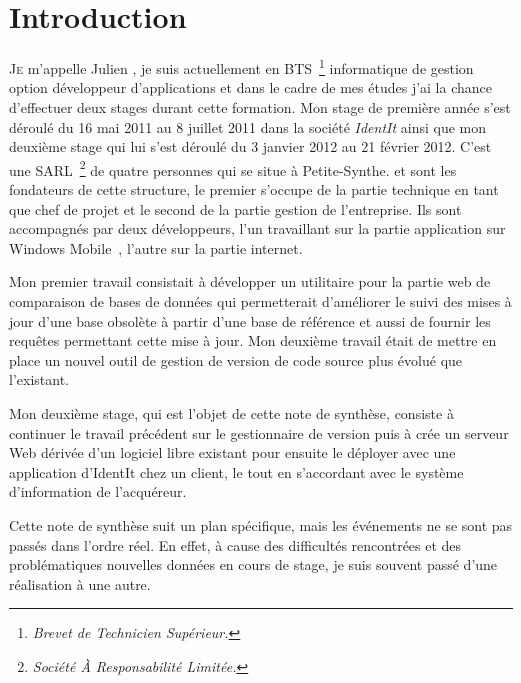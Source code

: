 \chapter{Introduction} %
\label{cha:Introduction}

\lettrine{J}{e} m'appelle Julien , je suis actuellement en
BTS\, \footnote{\emph{Brevet de Technicien Supérieur.}} informatique de
gestion option développeur d'applications et dans le cadre de mes études
j'ai la chance d'effectuer deux stages durant cette formation. Mon stage
de première année s'est déroulé du 16 mai 2011 au 8 juillet 2011 dans la
société \emph{IdentIt} ainsi que mon deuxième stage qui lui s'est
déroulé du 3 janvier 2012 au 21 février 2012. C'est une SARL\,
\footnote{\emph{Société À Responsabilité Limitée.}} de quatre personnes
qui se situe à Petite-Synthe.  et  sont
les fondateurs de cette structure, le premier s'occupe de la partie
technique en tant que chef de projet et le second de la partie gestion
de l'entreprise. Ils sont accompagnés par deux développeurs, l'un
travaillant sur la partie application sur Windows
Mobile~\textregistered, l'autre sur la partie internet.

Mon premier travail consistait à développer un utilitaire pour la partie
web de comparaison de bases de données qui permetterait d'améliorer le
suivi des mises à jour d'une base obsolète à partir d'une base de
référence et aussi de fournir les requêtes permettant cette mise à jour.
Mon deuxième travail était de mettre en place un nouvel outil de gestion
de version de code source plus évolué que l'existant.

Mon deuxième stage, qui est l'objet de cette note de synthèse, consiste
à continuer le travail précédent sur le gestionnaire de version puis à
crée un serveur Web dérivée d'un logiciel libre existant pour ensuite le
déployer avec une application d'IdentIt chez un client, le tout en
s'accordant avec le système d'information de l'acquéreur.

Cette note de synthèse suit un plan spécifique, mais les événements ne
se sont pas passés dans l'ordre réel. En effet, à cause des difficultés
rencontrées et des problématiques nouvelles données en cours de stage,
je suis souvent passé d'une réalisation à une autre.
